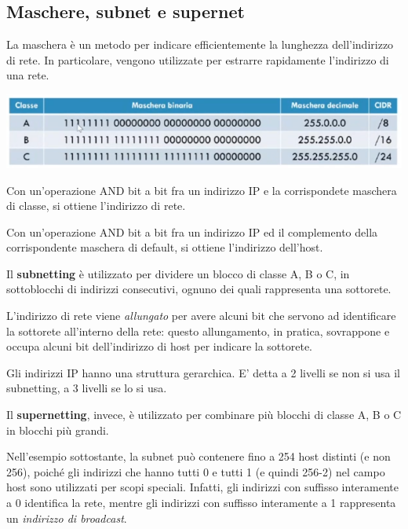    \subsection{Maschere, subnet e supernet}
    
        La maschera è un metodo per indicare efficientemente la lunghezza dell'indirizzo di rete. In particolare, vengono utilizzate per estrarre rapidamente l'indirizzo di una rete.
        
        \begin{center}
            \includegraphics[scale=0.5]{images/Maschera.png}
        \end{center}
        
        Con un'operazione AND bit a bit fra un indirizzo IP e la corrispondete maschera di classe, si ottiene l'indirizzo di rete.
        
        Con un'operazione AND bit a bit fra un indirizzo IP ed il complemento della corrispondente maschera di default, si ottiene l'indirizzo dell'host.
        
        \vspace{3mm}
        
        Il \textbf{subnetting} è utilizzato per dividere un blocco di classe A, B o C, in sottoblocchi di indirizzi consecutivi, ognuno dei quali rappresenta una sottorete. 
        
        L'indirizzo di rete viene \textit{allungato} per avere alcuni bit che servono ad identificare la sottorete all'interno della rete: questo allungamento, in pratica, sovrappone e occupa alcuni bit dell'indirizzo di host per indicare la sottorete.
        
        Gli indirizzi IP hanno una struttura gerarchica. E' detta a 2 livelli se non si usa il subnetting, a 3 livelli se lo si usa.
        
        \vspace{3mm}
        
        Il \textbf{supernetting}, invece, è utilizzato per combinare più blocchi di classe A, B o C in blocchi più grandi.
        
        \vspace{3mm}
        
        Nell'esempio sottostante, la subnet può contenere fino a 254 host distinti (e non 256), poiché gli indirizzi che hanno tutti 0 e tutti 1 (e quindi 256-2) nel campo host sono utilizzati per scopi speciali. Infatti, gli indirizzi con suffisso interamente a 0 identifica la rete, mentre gli indirizzi con suffisso interamente a 1 rappresenta un \textit{indirizzo di broadcast}.
        
